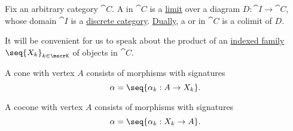 \begin{definition}\label{def:discrete_category_limits}
  Fix an arbitrary category \( \cat{C} \). A  in \( \cat{C} \) is a \hyperref[def:category_of_cones/limit]{limit} over a diagram \( D: \cat{I} \to \cat{C} \), whose domain \( \cat{I} \) is a \hyperref[def:discrete_category]{discrete category}. \hyperref[thm:categorical_principle_of_duality]{Dually}, a  or  in \( \cat{C} \) is a colimit of \( D \).

  It will be convenient for us to speak about the product of an \hyperref[def:cartesian_product/indexed_family]{indexed family} \( \seq{ X_k }_{k \in \mscrK} \) of objects in \( \cat{C} \).

  \begin{minipage}[t]{0.47\textwidth}
    A cone with vertex \( A \) consists of morphisms with signatures
    \begin{equation*}
      \alpha = \seq{ \alpha_k: A \to X_k }.
    \end{equation*}
  \end{minipage}
  \hfill
  \begin{minipage}[t]{0.47\textwidth}
    A cocone with vertex \( A \) consists of morphisms with signatures
    \begin{equation*}
      \alpha = \seq{ \alpha_k: X_k \to A }.
    \end{equation*}
  \end{minipage}


\end{definition}
